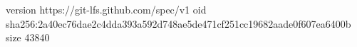version https://git-lfs.github.com/spec/v1
oid sha256:2a40ec76dae2c4dda393a592d748ae5de471cf251cc19682aade0f607ea6400b
size 43840
